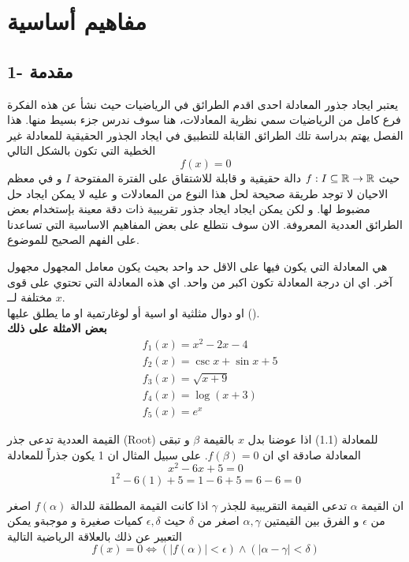 \chapter{مفاهيم أساسية}

\section*{1- مقدمة}
يعتبر ايجاد جذور المعادلة احدى اقدم الطرائق في الرياضيات حيث نشأ عن هذه الفكرة فرع كامل من الرياضيات سمي نظرية المعادلات، هنا سوف ندرس جزء بسيط منها. هذا الفصل يهتم بدراسة تلك الطرائق القابلة للتطبيق في ايجاد الجذور الحقيقية للمعادلة غير الخطية التي تكون بالشكل التالي
\begin{equation}
	f(x) = 0
\end{equation} 
حيث $f:I\subseteq\mathbb{R}\to\mathbb{R}$ دالة حقيقية و قابلة للاشتقاق على الفترة المفتوحة $I$ و في معظم الاحيان لا توجد طريقة صحيحة لحل هذا النوع من المعادلات و عليه لا يمكن ايجاد حل مضبوط لها. و لكن يمكن ايجاد ايجاد جذور تقريبية ذات دقة معينة بإستخدام بعض الطرائق العددية المعروفة. الان سوف نتطلع على بعض المفاهيم الاساسية التي تساعدنا على الفهم الصحيح للموضوع.
\begin{definition}
	هي المعادلة التي يكون فيها على الاقل حد واحد بحيث يكون معامل المجهول مجهول آخر. اي ان درجة المعادلة تكون اكبر من واحد. اي هذه المعادلة التي تحتوي على قوى مختلفة لــ $x$.\\
	او دوال مثلثية او اسية أو لوغارتمية او ما يطلق عليها ().\\
	\textbf{بعض الامثلة على ذلك}
	\begin{align*}
		& f_1(x) = x^2 - 2x - 4\\
		&f_2(x) = \csc x + \sin x + 5\\
		&f_3(x) = \sqrt{x+9}\\
		&f_4(x) = \log(x+3) \\
		&f_5(x) = e^x
	\end{align*}
\end{definition}

\begin{definition}
	القيمة العددية تدعى جذر (Root) للمعادلة (1.1) اذا عوضنا بدل $x$ بالقيمة $\beta$ و تبقى المعادلة صادقة اي ان $f(\beta)=0$. على سبيل المثال ان 1 يكون جذراً للمعادلة
	\[
	x^2 - 6x + 5 =0
	\]
	\[
	1^2 -6(1) + 5 = 1 - 6 + 5 = 6 -6 = 0
	\]
\end{definition}

\begin{definition}
	ان القيمة $\alpha$ تدعى القيمة التقريبية للجذر $\gamma$ اذا كانت القيمة المطلقة للدالة $f(\alpha)$ اصغر من $\epsilon$ و الفرق بين القيمتين $\alpha, \gamma$ اصغر من $\delta$ حيث $\epsilon, \delta$ كميات صغيرة و موجبةو يمكن التعبير عن ذلك بالعلاقة الرياضية التالية
	\[
	f(x) = 0 \iff (|f(\alpha)| < \epsilon) \wedge (|\alpha-\gamma|<\delta)
	\]
\end{definition}


